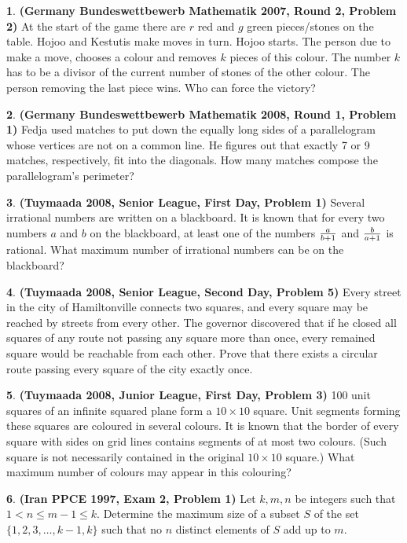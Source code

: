 \documentclass{article}
\newcommand{\plus}{+}
\newcommand{\minus}{-}
\theoremstyle{definition}
\newtheorem{p}{}
\begin{document}
\begin{p}{\bf (Germany Bundeswettbewerb Mathematik 2007, Round 2, Problem 2)}
At the start of the game there are $ r$ red and $ g$ green pieces/stones on the table. Hojoo and Kestutis make moves in turn. Hojoo starts. The person due to make a move, chooses a colour and removes $ k$ pieces of this colour. The number $ k$ has to be a divisor of the current number of stones of the other colour. The person removing the last piece wins. Who can force the victory?
\end{p}





\begin{p}{\bf (Germany Bundeswettbewerb Mathematik 2008, Round 1, Problem 1)}
Fedja used matches to put down the equally long sides of a parallelogram whose vertices are not on a common line. He figures out that exactly 7 or 9 matches, respectively, fit into the diagonals. How many matches compose the parallelogram's perimeter?
\end{p}





\begin{p}{\bf (Tuymaada 2008, Senior League, First Day, Problem 1)}
Several irrational numbers are written on a blackboard. It is known that for every two numbers $ a$ and $ b$ on the blackboard, at least one of the numbers $ a\over b\plus{}1$ and $ b\over a\plus{}1$ is rational. What maximum number of irrational numbers can be on the blackboard? 
\end{p}




\begin{p}{\bf (Tuymaada 2008, Senior League, Second Day, Problem 5)}
Every street in the city of Hamiltonville connects two squares, and every square may be reached by streets from every other. The governor discovered that if he closed all squares of any route not passing any square more than once, every remained square would be reachable from each other. Prove that there exists a circular route passing every square of the city exactly once. 
\end{p}





\begin{p}{\bf (Tuymaada 2008, Junior League, First Day, Problem 3)}
100 unit squares of an infinite squared plane form a $ 10\times 10$ square.  Unit segments forming these squares are coloured in several colours.  It is known that the border of every square with sides on grid lines contains segments of at most two colours. (Such square is not necessarily contained in the original $ 10\times 10$ square.) What maximum number of colours may appear in this colouring? 
\end{p}





\begin{p}{\bf (Iran PPCE 1997, Exam 2, Problem 1)}
Let $ k,m,n$ be integers such that $ 1 < n \leq m \minus{} 1 \leq k.$ Determine the maximum size of a subset $ S$ of the set $ \{1,2,3, \ldots, k\minus{}1,k\}$ such that no $ n$ distinct elements of $ S$ add up to $ m.$
\end{p}
\end{document}
